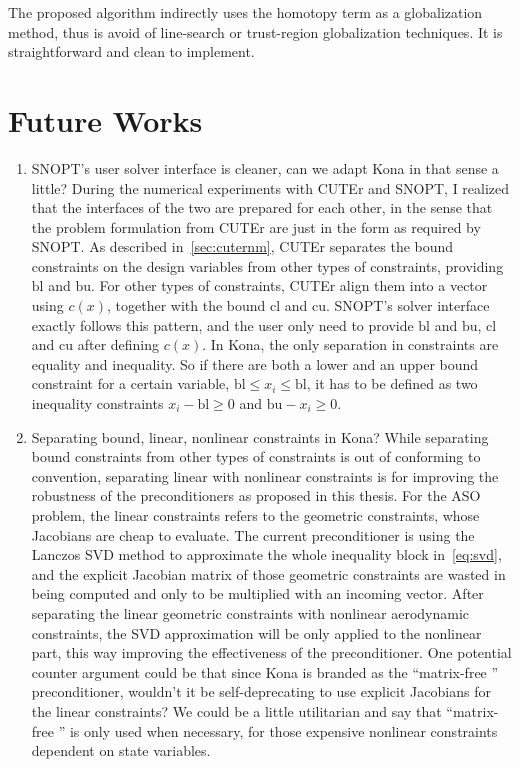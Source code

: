 The proposed algorithm indirectly uses the homotopy term as a globalization method, 
thus is avoid of line-search or trust-region globalization techniques. 
It is straightforward and clean to implement. 

\section{Future Works}

\begin{enumerate}
\item SNOPT's user solver interface is cleaner, can we adapt Kona in that sense a little? 
During the numerical experiments with CUTEr and SNOPT, I realized that the interfaces 
of the two are prepared for each other, in the sense that the problem formulation from CUTEr 
are just in the form as required by SNOPT. As described in~\ref{sec:cuternm}, CUTEr separates 
the bound constraints on the design variables from other types of constraints, providing $\text{bl}$ 
and $\text{bu}$. For other types of constraints, CUTEr align them into a vector using $c(x)$, 
together with the bound $\text{cl}$ and $\text{cu}$. SNOPT's solver interface exactly follows this 
pattern, and the user only need to provide $\text{bl}$ and $\text{bu}$,  $\text{cl}$ and $\text{cu}$ 
after defining $c(x)$. In Kona, the only separation in constraints 
are equality and inequality. So if there are both a lower and an upper bound constraint for a certain 
variable, $\text{bl} \leq x_i \leq \text{bl}$, it has to be defined as two inequality constraints 
$x_i - \text{bl} \geq 0 $ and $\text{bu} - x_i \geq 0 $. 

\item Separating bound, linear, nonlinear constraints in Kona? While separating bound constraints 
from other types of constraints is out of conforming to convention, separating linear with nonlinear 
constraints is for improving the robustness of the preconditioners as proposed in this thesis. For the 
ASO problem, the linear constraints refers to the geometric constraints, whose Jacobians are cheap 
to evaluate. The current preconditioner is using the Lanczos SVD method to approximate the whole 
inequality block in~\ref{eq:svd}, and the explicit Jacobian matrix of those geometric constraints are 
wasted in being computed and only to be multiplied with an incoming vector. After separating the linear 
geometric constraints with nonlinear aerodynamic constraints, the SVD approximation will be only 
applied to the nonlinear part, this way improving the effectiveness of the preconditioner. 
One potential counter argument could be that since Kona is branded as the ``matrix-free '' preconditioner, 
wouldn't it be self-deprecating to use explicit Jacobians for the linear constraints? We could be a little 
utilitarian and say that ``matrix-free '' is only used when necessary, for those expensive nonlinear 
constraints dependent on state variables. 


\end{enumerate}
